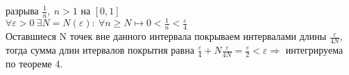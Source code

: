 \documentclass[a4paper,12pt]{article} %
\begin{document}
 разрыва $\frac{1}{n},~n>1$ на $[0,1]$\\
$\forall\varepsilon>0~\exists N=N(\varepsilon):~\forall n\geq N\longmapsto 0<\frac{1}{n}<\frac{\varepsilon}{4}$\\
Оставшиеся N точек вне данного интервала покрываем интервалами длины $\frac{\varepsilon}{4N}$, тогда сумма длин итервалов покрытия равна $\frac{\varepsilon}{4}+N\frac{\varepsilon}{4N}=\frac{\varepsilon}{2}<\varepsilon\Rightarrow$ интегрируема по теореме 4.
\end{document}
